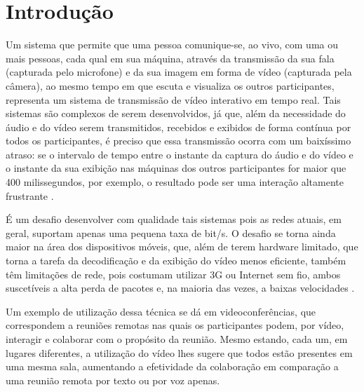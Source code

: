 \documentclass{acm_proc_article-sp}
\begin{document}

\section{Introdução}

Um sistema que permite que uma pessoa comunique-se, ao vivo, com uma ou mais
pessoas, cada qual em sua máquina, através da transmissão da sua fala (capturada pelo microfone) e da sua imagem em forma de vídeo (capturada pela câmera), ao mesmo tempo em que escuta e visualiza os outros participantes, representa um sistema de transmissão de vídeo interativo em tempo real. Tais sistemas são complexos de serem desenvolvidos, já que, além da necessidade do áudio e do vídeo serem transmitidos, recebidos e exibidos de forma contínua por todos os participantes, é preciso que essa transmissão ocorra com um baixíssimo atraso: se o intervalo de tempo entre o instante da captura do áudio e do vídeo e o instante da sua exibição nas máquinas dos outros participantes for maior que 400 milissegundos, por exemplo, o resultado pode ser uma interação altamente frustrante \cite{kurose_2001}.

É um desafio desenvolver com qualidade tais sistemas pois as redes atuais, em geral, suportam apenas uma pequena taxa de bit/s. O desafio se torna ainda maior na área dos dispositivos móveis, que, além de terem hardware limitado, que torna a tarefa da decodificação e da exibição do vídeo menos eficiente, também têm limitações de rede, pois costumam utilizar 3G ou Internet sem fio, ambos suscetíveis a alta perda de pacotes e, na maioria das vezes, a baixas velocidades \cite{huynh-thu_2008}.

Um exemplo de utilização dessa técnica se dá em videoconferências, que correspondem a reuniões remotas nas quais os participantes podem, por vídeo, interagir e colaborar com o propósito da reunião. Mesmo estando, cada um, em lugares diferentes, a utilização do vídeo lhes sugere que todos estão presentes em uma mesma sala, aumentando a efetividade da colaboração em comparação a uma reunião remota por texto ou por voz apenas.
\end{document}
